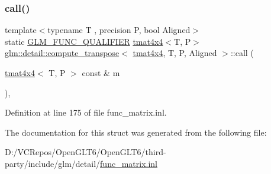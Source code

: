 \subsubsection{\texorpdfstring{call()}{call()}}
{\footnotesize\ttfamily template$<$typename T , precision P, bool Aligned$>$ \\
static \mbox{\hyperlink{setup_8hpp_a33fdea6f91c5f834105f7415e2a64407}{G\+L\+M\+\_\+\+F\+U\+N\+C\+\_\+\+Q\+U\+A\+L\+I\+F\+I\+ER}} \mbox{\hyperlink{structglm_1_1tmat4x4}{tmat4x4}}$<$T, P$>$ \mbox{\hyperlink{structglm_1_1detail_1_1compute__transpose}{glm\+::detail\+::compute\+\_\+transpose}}$<$ \mbox{\hyperlink{structglm_1_1tmat4x4}{tmat4x4}}, T, P, Aligned $>$\+::call (\begin{DoxyParamCaption}\item[{\mbox{\hyperlink{structglm_1_1tmat4x4}{tmat4x4}}$<$ T, P $>$ const \&}]{m }\end{DoxyParamCaption})\hspace{0.3cm}{\ttfamily [inline]}, {\ttfamily [static]}}



Definition at line 175 of file func\+\_\+matrix.\+inl.



The documentation for this struct was generated from the following file\+:\begin{DoxyCompactItemize}
\item 
D\+:/\+V\+C\+Repos/\+Open\+G\+L\+T6/\+Open\+G\+L\+T6/third-\/party/include/glm/detail/\mbox{\hyperlink{func__matrix_8inl}{func\+\_\+matrix.\+inl}}\end{DoxyCompactItemize}
